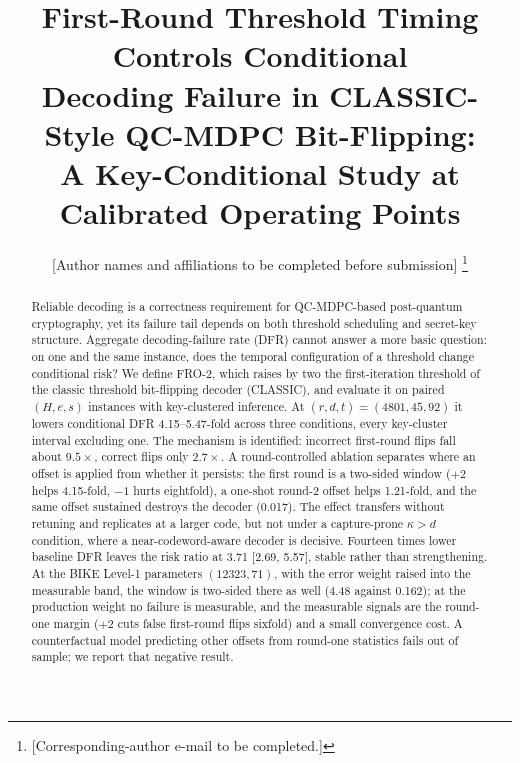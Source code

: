 \documentclass[lettersize,journal]{IEEEtran}
\begin{document}
\title{First-Round Threshold Timing Controls Conditional\\ Decoding Failure in CLASSIC-Style QC-MDPC Bit-Flipping:\\ A Key-Conditional Study at Calibrated Operating Points}

\author{[Author names and affiliations to be completed before submission]%
\thanks{[Corresponding-author e-mail to be completed.]}}

\maketitle

\begin{abstract}

Reliable decoding is a correctness requirement for QC-MDPC-based post-quantum cryptography, yet its failure tail depends on both threshold scheduling and secret-key structure. Aggregate decoding-failure rate (DFR) cannot answer a more basic question: on one and the same instance, does the temporal configuration of a threshold change conditional risk? We define FRO-2, which raises by two the first-iteration threshold of the classic threshold bit-flipping decoder (CLASSIC), and evaluate it on paired $(H,e,s)$ instances with key-clustered inference. At $(r,d,t)=(4801,45,92)$ it lowers conditional DFR 4.15--5.47-fold across three conditions, every key-cluster interval excluding one. The mechanism is identified: incorrect first-round flips fall about $9.5\times$, correct flips only $2.7\times$. A round-controlled ablation separates where an offset is applied from whether it persists: the first round is a two-sided window ($+2$ helps 4.15-fold, $-1$ hurts eightfold), a one-shot round-2 offset helps 1.21-fold, and the same offset sustained destroys the decoder (0.017). The effect transfers without retuning and replicates at a larger code, but not under a capture-prone $\kappa>d$ condition, where a near-codeword-aware decoder is decisive. Fourteen times lower baseline DFR leaves the risk ratio at 3.71 [2.69, 5.57], stable rather than strengthening. At the BIKE Level-1 parameters $(12323,71)$, with the error weight raised into the measurable band, the window is two-sided there as well (4.48 against 0.162); at the production weight no failure is measurable, and the measurable signals are the round-one margin ($+2$ cuts false first-round flips sixfold) and a small convergence cost. A counterfactual model predicting other offsets from round-one statistics fails out of sample; we report that negative result.
\end{abstract}
\end{document}
